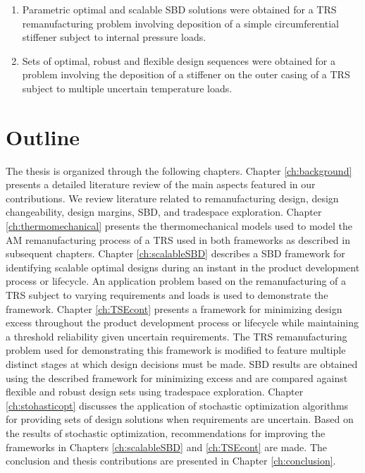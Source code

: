 \begin{enumerate}
	\item{Parametric optimal and scalable \ac{SBD} solutions were obtained for a \ac{TRS} remanufacturing problem involving deposition of a simple circumferential stiffener subject to internal pressure loads.}
	\item{Sets of optimal, robust and flexible design sequences were obtained for a problem involving the deposition of a stiffener on the outer casing of a \ac{TRS} subject to multiple uncertain temperature loads.}
\end{enumerate}

\section{Outline}
\label{sec:outline}

The thesis is organized through the following chapters. Chapter \ref{ch:background} presents a detailed literature review of the main aspects featured in our contributions. We review literature related to remanufacturing design, design changeability, design margins, \ac{SBD}, and tradespace exploration. Chapter \ref{ch:thermomechanical} presents the thermomechanical models used to model the \ac{AM} remanufacturing process of a \ac{TRS} used in both frameworks as described in subsequent chapters. Chapter \ref{ch:scalableSBD} describes a \ac{SBD} framework for identifying scalable optimal designs during an instant in the product development process or lifecycle. An application problem based on the remanufacturing of a \ac{TRS} subject to varying requirements and loads is used to demonstrate the framework. Chapter \ref{ch:TSEcont} presents a framework for minimizing design excess throughout the product development process or lifecycle while maintaining a threshold reliability given uncertain requirements. The \ac{TRS} remanufacturing problem used for demonstrating this framework is modified to feature multiple distinct stages at which design decisions must be made. \ac{SBD} results are obtained using the described framework for minimizing excess and are compared against flexible and robust design sets using tradespace exploration. Chapter \ref{ch:stohasticopt} discusses the application of stochastic optimization algorithms for providing sets of design solutions when requirements are uncertain. Based on the results of stochastic optimization, recommendations for improving the frameworks in Chapters \ref{ch:scalableSBD} and \ref{ch:TSEcont} are made. The conclusion and thesis contributions are presented in Chapter \ref{ch:conclusion}.